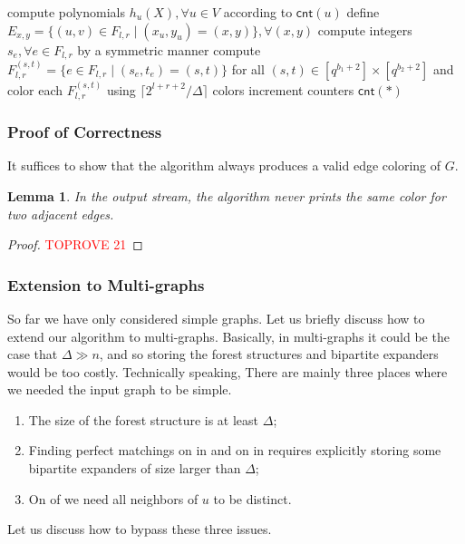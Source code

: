\documentclass[11pt,a4paper]{article}
\newtheorem{lemma}{Lemma}[section]
\newcommand{\ceil}[1]{\lceil #1 \rceil}
\newcommand{\cnt}{\mathsf{cnt}}
\begin{document}
\begin{algorithm}
    \caption{$\textsc{DetColorHighDeg}(F)$}\label{det-alg-high}
    compute polynomials $h_u(X), \forall u\in V$ according to $\cnt(u)$\;
    define $E_{x, y} = \{(u, v)\in F_{l, r}\mid (x_u, y_u) = (x, y)\}, \forall (x, y)$\;
    \For{$u\in L$ such that $\deg_F(u)\in [2^l, 2^{l+1})$}{
        let $v_1, v_2, \ldots, v_k$ be all of $u$'s neighbor in $F_{l, r}$\;\label{distinct-neighbors}
        compute integers $t_{(u, v_i)}, 1\leq i\leq k$ using bipartite matchings\;\label{perfect-matching-high}
    }
    compute integers $s_{e}, \forall e\in F_{l, r}$ by a symmetric manner\;
    compute $F_{l, r}^{(s, t)} = \{e\in F_{l, r}\mid (s_e, t_e) = (s, t)\}$ for all $(s, t)\in [q^{b_1+2}]\times [q^{b_2+2}]$ and color each $F_{l, r}^{(s, t)}$ using $\ceil{2^{l+r+2}/\Delta}$ colors\;
    increment counters $\cnt(*)$\;
\end{algorithm}

\subsubsection{Proof of Correctness}
It suffices to show that the algorithm always produces a valid edge coloring of $G$.
\begin{lemma}
	In the output stream, the algorithm never prints the same color for two adjacent edges.
\end{lemma}
\begin{proof}\textcolor{red}{TOPROVE 21}\end{proof}

\subsubsection{Extension to Multi-graphs}
So far we have only considered simple graphs. Let us briefly discuss how to extend our algorithm to multi-graphs. Basically, in multi-graphs it could be the case that $\Delta \gg n$, and so storing the forest structures and bipartite expanders would be too costly. Technically speaking, There are mainly three places where we needed the input graph to be simple.
\begin{enumerate}[(1)]
    \item The size of the forest structure is at least $\Delta$; 
    \item Finding perfect matchings on  in  and on  in  requires explicitly storing some bipartite expanders of size larger than $\Delta$; 
    \item On  of  we need all neighbors of $u$ to be distinct. 
\end{enumerate}
Let us discuss how to bypass these three issues.
\end{document}
